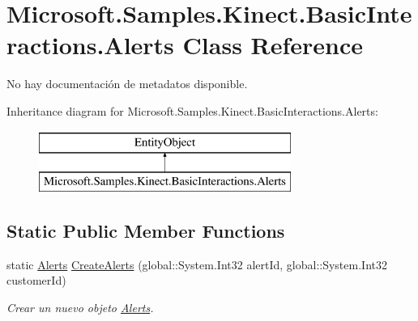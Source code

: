 \hypertarget{class_microsoft_1_1_samples_1_1_kinect_1_1_basic_interactions_1_1_alerts}{\section{Microsoft.\-Samples.\-Kinect.\-Basic\-Interactions.\-Alerts Class Reference}
\label{class_microsoft_1_1_samples_1_1_kinect_1_1_basic_interactions_1_1_alerts}
}


No hay documentación de metadatos disponible.  


Inheritance diagram for Microsoft.\-Samples.\-Kinect.\-Basic\-Interactions.\-Alerts\-:\begin{figure}[H]
\begin{center}
\leavevmode
\includegraphics[height=2.000000cm]{class_microsoft_1_1_samples_1_1_kinect_1_1_basic_interactions_1_1_alerts}
\end{center}
\end{figure}
\subsection*{Static Public Member Functions}
\begin{DoxyCompactItemize}
\item 
static \hyperlink{class_microsoft_1_1_samples_1_1_kinect_1_1_basic_interactions_1_1_alerts}{Alerts} \hyperlink{class_microsoft_1_1_samples_1_1_kinect_1_1_basic_interactions_1_1_alerts_abd1fd35250dbacf14fb065802e015e02}{Create\-Alerts} (global\-::\-System.\-Int32 alert\-Id, global\-::\-System.\-Int32 customer\-Id)
\begin{DoxyCompactList}\small\item\em Crear un nuevo objeto \hyperlink{class_microsoft_1_1_samples_1_1_kinect_1_1_basic_interactions_1_1_alerts}{Alerts}. \end{DoxyCompactList}\end{DoxyCompactItemize}
